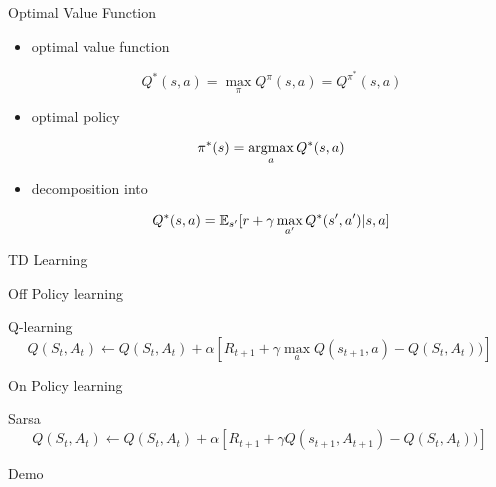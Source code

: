 \begin{frame}{Optimal Value Function}
      \begin{itemize}
        \item optimal value function

      \begin{equation*}
        Q^{*}(s,a)=\max_{\pi} Q^{\pi}(s,a)=Q^{\pi^*}(s,a)
      \end{equation*}

      \item optimal policy

      \begin{equation*}
        \pi^{*}(s)=\operatorname*{argmax}_{a}Q^*(s,a)
      \end{equation*}

    \item decomposition into

      \begin{equation*}
        Q^{*}(s,a)=\operatorname{\mathbb{E}}_{s'}[r+\gamma \max_{a'}Q^{*}(s',a')|s,a]
      \end{equation*}

      \end{itemize}
\end{frame}

\begin{frame}{TD Learning}

Off Policy learning 
      \begin{block}{Q-learning}
        \begin{equation*}
            Q(S_t,A_t)\gets Q(S_t,A_t)+\alpha[R_{t+1}+ \gamma \max_a Q(s_{t+1},a)-Q(S_t,A_t))]
        \end{equation*}
      \end{block}

On Policy learning
      \begin{block}{Sarsa}
        \begin{equation*}
            Q(S_t,A_t)\gets Q(S_t,A_t)+\alpha[R_{t+1}+ \gamma Q(s_{t+1},A_{t+1})-Q(S_t,A_t))]
        \end{equation*}
      \end{block}

\end{frame}

\begin{frame}[standout]
  Demo
\end{frame}

